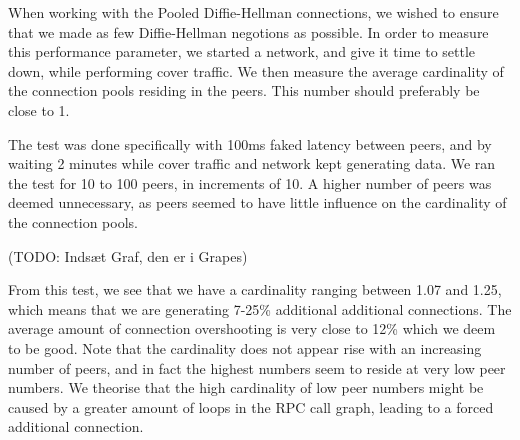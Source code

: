 When working with the Pooled Diffie-Hellman connections, we wished to ensure that we made as few Diffie-Hellman negotions as possible. In order to measure this performance parameter, we started a network, and give it time to settle down, while performing cover traffic. We then measure the average cardinality of the connection pools residing in the peers. This number should preferably be close to 1.

The test was done specifically with 100ms faked latency between peers, and by waiting 2 minutes while cover traffic and network kept generating data. We ran the test for 10 to 100 peers, in increments of 10. A higher number of peers was deemed unnecessary, as peers seemed to have little influence on the cardinality of the connection pools.

(TODO: Indsæt Graf, den er i Grapes)

From this test, we see that we have a cardinality ranging between 1.07 and 1.25, which means that we are generating 7-25\% additional additional connections. The average amount of connection overshooting is very close to 12\% which we deem to be good. Note that the cardinality does not appear rise with an increasing number of peers, and in fact the highest numbers seem to reside at very low peer numbers. We theorise that the high cardinality of low peer numbers might be caused by a greater amount of loops in the RPC call graph, leading to a forced additional connection.
